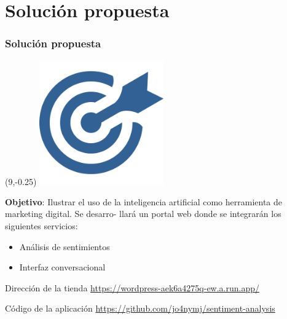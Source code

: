 \documentclass[10pt]{beamer}
\begin{document}
\section{Solución propuesta}
\begin{frame}
\frametitle{Solución propuesta}
\begin{textblock}{5}(9,-0.25)
	\includegraphics[width = 0.4\textwidth]{Figuras/goal.png}
\end{textblock}
\begin{minipage}[c][3cm]{0.73\textwidth}
\textbf{\textcolor{burgundy}{Objetivo}}: Ilustrar el uso de la inteligencia artificial como herramienta de marketing digital. Se desarro-
llará un portal web donde se integrarán los siguientes servicios:
\vspace{.15cm}

\begin{itemize}
	\item Análisis de sentimientos
	\vspace{.15cm}
	\item Interfaz conversacional
\end{itemize}

\end{minipage}
\pause

\vspace{.5cm}
\begin{block}{Dirección de la tienda}
\url{https://wordpress-aek6a4275q-ew.a.run.app/}
\end{block}

\pause
\vspace{.5cm}

\begin{block}{Código de la aplicación}
\url{https://github.com/jo4nymj/sentiment-analysis}
\end{block}
\end{frame}
\end{document}
